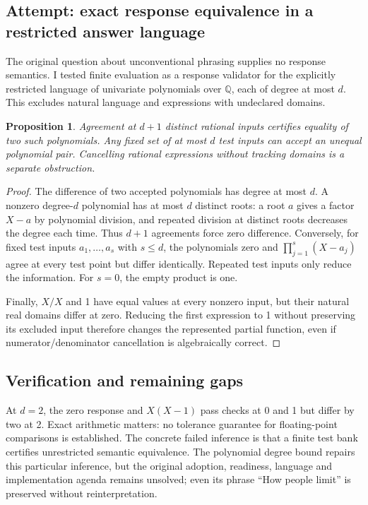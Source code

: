 \documentclass[11pt]{article}
\newtheorem{proposition}{Proposition}
\begin{document}
\subsection{Attempt: exact response equivalence in a restricted answer language}
The original question about unconventional phrasing supplies no response semantics. I tested finite evaluation as a response validator for the explicitly restricted language of univariate polynomials over $\mathbb Q$, each of degree at most $d$. This excludes natural language and expressions with undeclared domains.
\begin{proposition}
Agreement at $d+1$ distinct rational inputs certifies equality of two such polynomials. Any fixed set of at most $d$ test inputs can accept an unequal polynomial pair. Cancelling rational expressions without tracking domains is a separate obstruction.
\end{proposition}
\begin{proof}
The difference of two accepted polynomials has degree at most $d$. A nonzero degree-$d$ polynomial has at most $d$ distinct roots: a root $a$ gives a factor $X-a$ by polynomial division, and repeated division at distinct roots decreases the degree each time. Thus $d+1$ agreements force zero difference. Conversely, for fixed test inputs $a_1,\ldots,a_s$ with $s\le d$, the polynomials zero and $\prod_{j=1}^s(X-a_j)$ agree at every test point but differ identically. Repeated test inputs only reduce the information. For $s=0$, the empty product is one.

Finally, $X/X$ and 1 have equal values at every nonzero input, but their natural real domains differ at zero. Reducing the first expression to 1 without preserving its excluded input therefore changes the represented partial function, even if numerator/denominator cancellation is algebraically correct.
\end{proof}
\subsection{Verification and remaining gaps}
At $d=2$, the zero response and $X(X-1)$ pass checks at 0 and 1 but differ by two at 2. Exact arithmetic matters: no tolerance guarantee for floating-point comparisons is established. The concrete failed inference is that a finite test bank certifies unrestricted semantic equivalence. The polynomial degree bound repairs this particular inference, but the original adoption, readiness, language and implementation agenda remains unsolved; even its phrase ``How people limit'' is preserved without reinterpretation.
\end{document}
